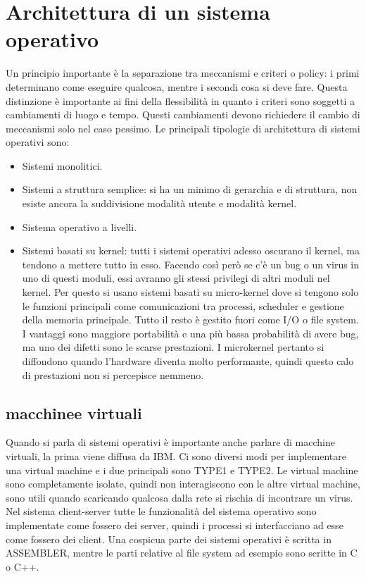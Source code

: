 \chapter{Architettura di un sistema operativo}
Un principio importante \`e la separazione tra meccanismi e criteri o policy: i primi determinano come eseguire qualcosa, mentre i secondi cosa si deve fare. Questa distinzione \`e importante ai fini della
flessibilit\`a in quanto i criteri sono soggetti a cambiamenti di luogo e tempo. Questi cambiamenti devono richiedere il cambio di meccanismi solo nel caso pessimo. Le principali tipologie di architettura di sistemi operativi sono:
\begin{itemize}
	\item Sistemi monolitici.
	\item Sistemi a struttura semplice: si ha un minimo di gerarchia e di struttura, non esiste  ancora la suddivisione modalità utente e modalità kernel.
	\item Sistema operativo a livelli.
	\item Sistemi basati su kernel: tutti i sistemi operativi adesso oscurano il kernel, ma tendono a mettere tutto in esso. Facendo così però se c’è un bug o un virus in uno di questi moduli, essi avranno gli stessi privilegi di
		altri moduli nel kernel. Per questo si usano sistemi basati su micro-kernel dove si tengono solo le funzioni principali come comunicazioni tra processi, scheduler e gestione della memoria principale. Tutto il resto è 
		gestito fuori come I/O o file system. I vantaggi sono maggiore portabilità e una più bassa probabilità di avere bug, ma uno dei difetti sono le scarse prestazioni. I microkernel pertanto si diffondono quando l’hardware 
		diventa molto performante, quindi questo calo di prestazioni non si percepisce nemmeno.
\end{itemize}
\section{macchinee virtuali}
Quando si parla di sistemi operativi è importante anche parlare di macchine virtuali, la prima viene diffusa da IBM. Ci sono diversi modi per implementare una virtual machine e i due principali sono TYPE1 e TYPE2. 
Le virtual machine sono completamente isolate, quindi non interagiscono con le altre virtual machine, sono utili quando scaricando qualcosa dalla rete si rischia di incontrare un virus. Nel sistema client-server tutte le funzionalità del 
sistema operativo sono implementate come fossero dei server, quindi i processi si interfacciano ad esse come fossero dei client. Una cospicua parte dei sistemi operativi è scritta in ASSEMBLER, mentre le parti relative al file system ad 
esempio sono scritte in C o C++. 
